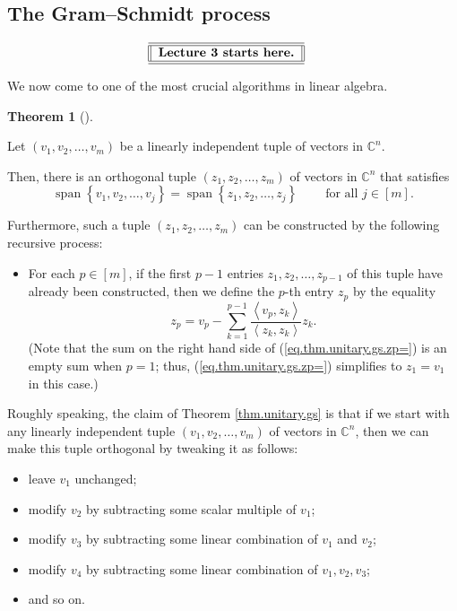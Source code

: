 \documentclass[numbers=enddot,12pt,final,onecolumn,notitlepage]{scrartcl}%
\numberwithin{exer}{subsection}
\theoremstyle{definition}
\newtheorem{theo}{Theorem}[subsection]
\newenvironment{theorem}[1][]
{\begin{theo}[#1]\begin{leftbar}}
{\end{leftbar}\end{theo}}
\let\sumnonlimits\sum
\renewcommand{\sum}{\sumnonlimits\limits}
\begin{document}
\subsection{The Gram--Schmidt process}%

\[%
\begin{tabular}
[c]{||l||}\hline\hline
\textbf{Lecture 3 starts here.}\\\hline\hline
\end{tabular}
\ \ \
\]


We now come to one of the most crucial algorithms in linear algebra.

\begin{theorem}
[Gram--Schmidt process]\label{thm.unitary.gs}Let $\left(  v_{1},v_{2}%
,\ldots,v_{m}\right)  $ be a linearly independent tuple of vectors in
$\mathbb{C}^{n}$.

Then, there is an orthogonal tuple $\left(  z_{1},z_{2},\ldots,z_{m}\right)  $
of vectors in $\mathbb{C}^{n}$ that satisfies%
\[
\operatorname*{span}\left\{  v_{1},v_{2},\ldots,v_{j}\right\}
=\operatorname*{span}\left\{  z_{1},z_{2},\ldots,z_{j}\right\}
\ \ \ \ \ \ \ \ \ \ \text{for all }j\in\left[  m\right]  .
\]


Furthermore, such a tuple $\left(  z_{1},z_{2},\ldots,z_{m}\right)  $ can be
constructed by the following recursive process:

\begin{itemize}
\item For each $p\in\left[  m\right]  $, if the first $p-1$ entries
$z_{1},z_{2},\ldots,z_{p-1}$ of this tuple have already been constructed, then
we define the $p$-th entry $z_{p}$ by the equality%
\begin{equation}
z_{p}=v_{p}-\sum_{k=1}^{p-1}\dfrac{\left\langle v_{p},z_{k}\right\rangle
}{\left\langle z_{k},z_{k}\right\rangle }z_{k}. \label{eq.thm.unitary.gs.zp=}%
\end{equation}
(Note that the sum on the right hand side of (\ref{eq.thm.unitary.gs.zp=}) is
an empty sum when $p=1$; thus, (\ref{eq.thm.unitary.gs.zp=}) simplifies to
$z_{1}=v_{1}$ in this case.)
\end{itemize}
\end{theorem}

Roughly speaking, the claim of Theorem \ref{thm.unitary.gs} is that if we
start with any linearly independent tuple $\left(  v_{1},v_{2},\ldots
,v_{m}\right)  $ of vectors in $\mathbb{C}^{n}$, then we can make this tuple
orthogonal by tweaking it as follows:

\begin{itemize}
\item leave $v_{1}$ unchanged;

\item modify $v_{2}$ by subtracting some scalar multiple of $v_{1}$;

\item modify $v_{3}$ by subtracting some linear combination of $v_{1}$ and
$v_{2}$;

\item modify $v_{4}$ by subtracting some linear combination of $v_{1}%
,v_{2},v_{3}$;

\item and so on.
\end{itemize}
\end{document}

